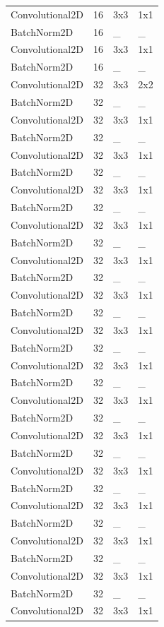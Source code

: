 \begin{center}
\begin{longtable}{|l|l|l|l|}
		Convolutional2D & 16 & 3x3 & 1x1 \\
		BatchNorm2D & 16 & \_ & \_ \\
		Convolutional2D & 16 & 3x3 & 1x1 \\
		BatchNorm2D & 16 & \_ & \_ \\
		Convolutional2D & 32 & 3x3 & 2x2 \\
		BatchNorm2D & 32 & \_ & \_ \\
		Convolutional2D & 32 & 3x3 & 1x1 \\
		BatchNorm2D & 32 & \_ & \_ \\
		Convolutional2D & 32 & 3x3 & 1x1 \\
		BatchNorm2D & 32 & \_ & \_ \\
		Convolutional2D & 32 & 3x3 & 1x1 \\
		BatchNorm2D & 32 & \_ & \_ \\
		Convolutional2D & 32 & 3x3 & 1x1 \\
		BatchNorm2D & 32 & \_ & \_ \\
		Convolutional2D & 32 & 3x3 & 1x1 \\
		BatchNorm2D & 32 & \_ & \_ \\
		Convolutional2D & 32 & 3x3 & 1x1 \\
		BatchNorm2D & 32 & \_ & \_ \\
		Convolutional2D & 32 & 3x3 & 1x1 \\
		BatchNorm2D & 32 & \_ & \_ \\
		Convolutional2D & 32 & 3x3 & 1x1 \\
		BatchNorm2D & 32 & \_ & \_ \\
		Convolutional2D & 32 & 3x3 & 1x1 \\
		BatchNorm2D & 32 & \_ & \_ \\
		Convolutional2D & 32 & 3x3 & 1x1 \\
		BatchNorm2D & 32 & \_ & \_ \\
		Convolutional2D & 32 & 3x3 & 1x1 \\
		BatchNorm2D & 32 & \_ & \_ \\
		Convolutional2D & 32 & 3x3 & 1x1 \\
		BatchNorm2D & 32 & \_ & \_ \\
		Convolutional2D & 32 & 3x3 & 1x1 \\
		BatchNorm2D & 32 & \_ & \_ \\
		Convolutional2D & 32 & 3x3 & 1x1 \\
		BatchNorm2D & 32 & \_ & \_ \\
		Convolutional2D & 32 & 3x3 & 1x1 \\

\end{longtable}
\end{center}
